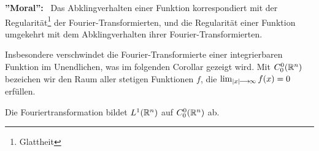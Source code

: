 \documentclass[skript.tex]{subfiles}
\begin{document}
\textbf{''Moral'':} \, Das Abklingverhalten einer Funktion korrespondiert mit der Regularität\footnote{Glattheit} der Fourier-Transformierten, und die Regularität einer Funktion umgekehrt mit dem Abklingverhalten ihrer Fourier-Transformierten. 

Insbesondere verschwindet die Fourier-Transformierte einer integrierbaren Funktion im Unendlichen, was im folgenden Corollar gezeigt wird. Mit $C_0^0 ({\mathbb{R}^n})$ bezeichen wir den Raum aller stetigen Funktionen $f$, die $\lim_{\left| x \right|\kern -1pt \longrightarrow \kern -1pt\infty} f(x) = 0$ erfüllen. 

\begin{cor}
	Die Fouriertransformation bildet $L^1({\mathbb{R}^n})$ auf $C_0^0({\mathbb{R}^n})$ ab.
\end{cor}
	
	
	
	
\end{document}
